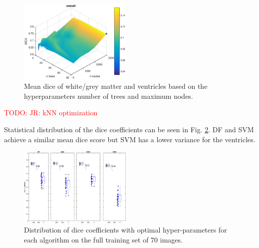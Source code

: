 \documentclass[journal]{IEEEtran}
\newcommand\TODO[1]{\textcolor{red}{TODO: #1}}
\begin{document}
\begin{figure}[h!]\label{f.df_white}
	\centering
	\includegraphics[width=0.48\textwidth]{images/DF_crossval}
	\caption{Mean dice of white/grey matter and ventricles based on the hyperparameters number of trees and maximum nodes.}
\end{figure}

\TODO{JR: kNN optimization}

Statistical distribution of the dice coefficients can be seen in Fig. \ref{f.boxplot}. DF and SVM achieve a similar mean dice score but SVM has a lower variance for the ventricles.
\begin{figure}\label{f.boxplot}
	\centering
	\includegraphics[width=0.48\textwidth]{images/boxplot}
	\caption{Distribution of dice coefficients with optimal hyper-parameters for each algorithm on the full training set of 70 images.}
\end{figure}
\end{document}
